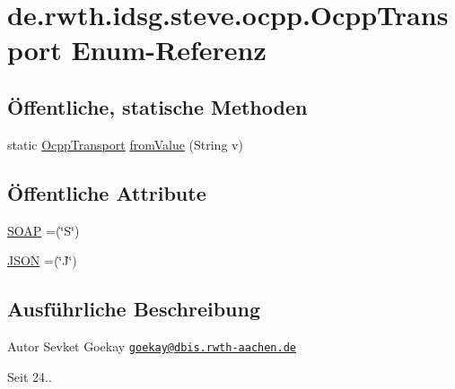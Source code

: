 \hypertarget{enumde_1_1rwth_1_1idsg_1_1steve_1_1ocpp_1_1_ocpp_transport}{\section{de.\-rwth.\-idsg.\-steve.\-ocpp.\-Ocpp\-Transport Enum-\/\-Referenz}
\label{enumde_1_1rwth_1_1idsg_1_1steve_1_1ocpp_1_1_ocpp_transport}
}
\subsection*{Öffentliche, statische Methoden}
\begin{DoxyCompactItemize}
\item 
static \hyperlink{enumde_1_1rwth_1_1idsg_1_1steve_1_1ocpp_1_1_ocpp_transport}{Ocpp\-Transport} \hyperlink{enumde_1_1rwth_1_1idsg_1_1steve_1_1ocpp_1_1_ocpp_transport_a64ec586d12d40966424ce811f697b852}{from\-Value} (String v)
\end{DoxyCompactItemize}
\subsection*{Öffentliche Attribute}
\begin{DoxyCompactItemize}
\item 
\hyperlink{enumde_1_1rwth_1_1idsg_1_1steve_1_1ocpp_1_1_ocpp_transport_ae1fa7bdd519c49e7c5d175538ec2eb47}{S\-O\-A\-P} =(\char`\"{}S\char`\"{})
\item 
\hyperlink{enumde_1_1rwth_1_1idsg_1_1steve_1_1ocpp_1_1_ocpp_transport_aa9ac4184d327d7868285a13790f45cdc}{J\-S\-O\-N} =(\char`\"{}J\char`\"{})
\end{DoxyCompactItemize}


\subsection{Ausführliche Beschreibung}
\begin{DoxyAuthor}{Autor}
Sevket Goekay \href{mailto:goekay@dbis.rwth-aachen.de}{\tt goekay@dbis.\-rwth-\/aachen.\-de} 
\end{DoxyAuthor}
\begin{DoxySince}{Seit}
24.. 
\end{DoxySince}


